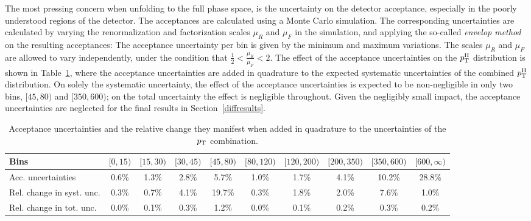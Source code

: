 The most pressing concern when unfolding to the full phase space, is the uncertainty on the detector acceptance, especially in the poorly understood regions of the detector.
% 
The acceptances are calculated using a Monte Carlo simulation.
% 
The corresponding uncertainties are calculated by varying the renormalization and factorization scales $\mu_R$ and $\mu_F$ in the simulation, and applying the so-called \emph{envelop method} on the resulting acceptances: The acceptance uncertainty per bin is given by the minimum and maximum variations.
% 
The scales $\mu_R$ and $\mu_F$ are allowed to vary independently, under the condition that $\frac{1}{2} < \frac{\mu_R}{\mu_F} < 2$.
% 
The effect of the acceptance uncertainties on the $p_\mathrm{T}^\mathrm{H}$ distribution is shown in Table~\ref{tab:accuncertainties}, where the acceptance uncertainties are added in quadrature to the expected systematic uncertainties of the combined $p_\mathrm{T}^\mathrm{H}$ distribution.
% 
On solely the systematic uncertainty, the effect of the acceptance uncertainties is expected to be non-negligible in only two bins, $[45,80)$ and $[350,600)$; on the total uncertainty the effect is negligible throughout.
% 
Given the negligibly small impact, the acceptance uncertainties are neglected for the final results in Section~\ref{diffresults}.

\begin{table}[h!]
\footnotesize
\caption{
    Acceptance uncertainties and the relative change they manifest when added in quadrature to the uncertainties of the $p_\mathrm{T}$ combination.
    }
\label{tab:accuncertainties}
\begin{center}
\setlength\tabcolsep{3pt}
\begin{tabular}{lccccccccc}
Bins                      & $[0,15)$ & $[15,30)$ & $[30,45)$ & $[45,80)$ & $[80,120)$ & $[120,200)$ & $[200,350)$ & $[350,600)$ & $[600,\infty)$  \\
\hline
Acc. uncertainties        & 0.6\%   & 1.3\%    & 2.8\%    & 5.7\%    & 1.0\%     & 1.7\%      & 4.1\%      & 10.2\%     & 28.8\%  \\
Rel. change in syst. unc. & 0.3\%   & 0.7\%    & 4.1\%    & 19.7\%   & 0.3\%     & 1.8\%      & 2.0\%      & 7.6\%      & 1.0\%   \\
Rel. change in tot. unc.  & 0.0\%   & 0.1\%    & 0.3\%    & 1.2\%    & 0.0\%     & 0.1\%      & 0.2\%      & 0.3\%      & 0.2\%   \\
\end{tabular}
\end{center}
\end{table}


